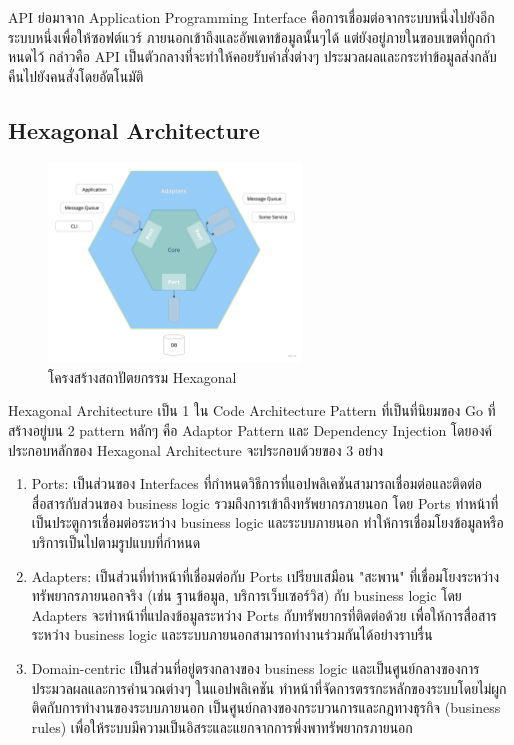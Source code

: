     \qquad API ย่อมาจาก Application Programming Interface คือการเชื่อมต่อจากระบบหนึ่งไปยังอีกระบบหนึ่งเพื่อให้ซอฟต์แวร์
    ภายนอกเข้าถึงและอัพเดทข้อมูลนั้นๆได้ แต่ยังอยู่ภายในขอบเขตที่ถูกกําหนดไว้ กล่าวคือ API เป็นตัวกลางที่จะทําให้คอยรับคําสั่งต่างๆ 
    ประมวลผลและกระทําข้อมูลส่งกลับคืนไปยังคนสั่งโดยอัตโนมัติ \cite{RESTAPI}
  \subsection{Hexagonal Architecture}
    \begin{figure}[!h]
      \centering
      \includegraphics[width=0.6\textwidth]{image/Background/hex.png}
      \caption[Hexagonal Architecture]{โครงสร้างสถาปัตยกรรม Hexagonal}
      \label{fig:hex_pic}
    \end{figure}
    \FloatBarrier
    \qquad Hexagonal Architecture เป็น 1 ใน Code Architecture Pattern ที่เป็นที่นิยมของ Go ที่สร้างอยู่บน 2 pattern หลักๆ คือ Adaptor Pattern และ Dependency Injection  โดยองค์ประกอบหลักของ Hexagonal Architecture จะประกอบด้วยของ 3 อย่าง \cite{Hexagonal1}\cite{Hexagonal2}
    \begin{enumerate}
      \item Ports: เป็นส่วนของ Interfaces ที่กำหนดวิธีการที่แอปพลิเคชันสามารถเชื่อมต่อและติดต่อสื่อสารกับส่วนของ business logic รวมถึงการเข้าถึงทรัพยากรภายนอก โดย Ports ทำหน้าที่เป็นประตูการเชื่อมต่อระหว่าง business logic และระบบภายนอก ทำให้การเชื่อมโยงข้อมูลหรือบริการเป็นไปตามรูปแบบที่กำหนด\
      \item Adapters: เป็นส่วนที่ทำหน้าที่เชื่อมต่อกับ Ports เปรียบเสมือน "สะพาน" ที่เชื่อมโยงระหว่างทรัพยากรภายนอกจริง (เช่น ฐานข้อมูล, บริการเว็บเซอร์วิส) กับ business logic โดย Adapters จะทำหน้าที่แปลงข้อมูลระหว่าง Ports กับทรัพยากรที่ติดต่อด้วย เพื่อให้การสื่อสารระหว่าง business logic และระบบภายนอกสามารถทำงานร่วมกันได้อย่างราบรื่น
      \item Domain-centric เป็นส่วนที่อยู่ตรงกลางของ business logic และเป็นศูนย์กลางของการประมวลผลและการคำนวณต่างๆ ในแอปพลิเคชัน ทำหน้าที่จัดการตรรกะหลักของระบบโดยไม่ผูกติดกับการทำงานของระบบภายนอก เป็นศูนย์กลางของกระบวนการและกฎทางธุรกิจ (business rules) เพื่อให้ระบบมีความเป็นอิสระและแยกจากการพึ่งพาทรัพยากรภายนอก
    \end{enumerate}
